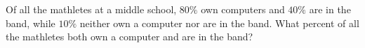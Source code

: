 Of all the mathletes at a middle school, $80\%$ own computers and $40\%$ are in the band, while $10\%$ neither own a computer nor are in the band. What percent of all the mathletes both own a computer and are in the band?

